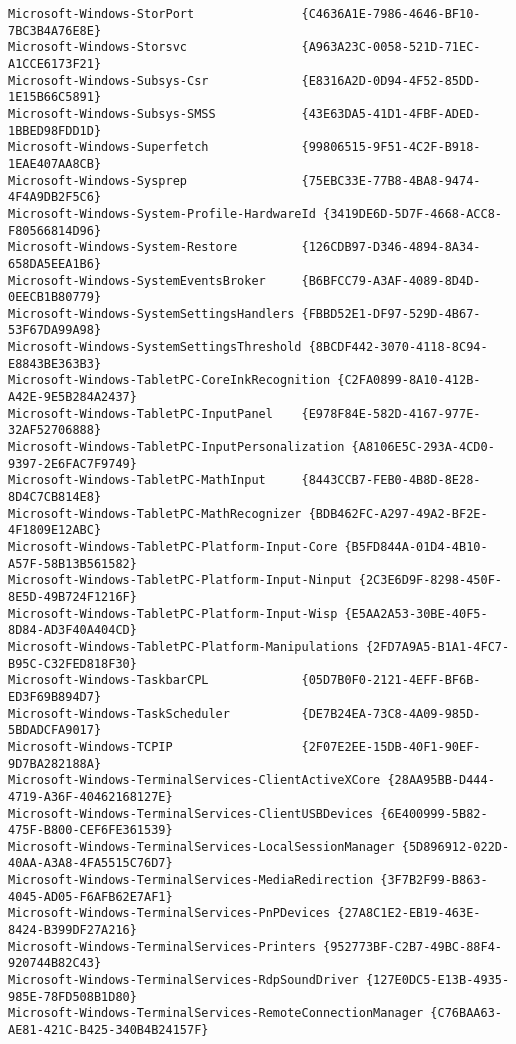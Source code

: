 \documentclass{report}
\begin{document}
\begin{lstlisting}[breaklines=true,basicstyle=\tiny]
Microsoft-Windows-StorPort               {C4636A1E-7986-4646-BF10-7BC3B4A76E8E}
Microsoft-Windows-Storsvc                {A963A23C-0058-521D-71EC-A1CCE6173F21}
Microsoft-Windows-Subsys-Csr             {E8316A2D-0D94-4F52-85DD-1E15B66C5891}
Microsoft-Windows-Subsys-SMSS            {43E63DA5-41D1-4FBF-ADED-1BBED98FDD1D}
Microsoft-Windows-Superfetch             {99806515-9F51-4C2F-B918-1EAE407AA8CB}
Microsoft-Windows-Sysprep                {75EBC33E-77B8-4BA8-9474-4F4A9DB2F5C6}
Microsoft-Windows-System-Profile-HardwareId {3419DE6D-5D7F-4668-ACC8-F80566814D96}
Microsoft-Windows-System-Restore         {126CDB97-D346-4894-8A34-658DA5EEA1B6}
Microsoft-Windows-SystemEventsBroker     {B6BFCC79-A3AF-4089-8D4D-0EECB1B80779}
Microsoft-Windows-SystemSettingsHandlers {FBBD52E1-DF97-529D-4B67-53F67DA99A98}
Microsoft-Windows-SystemSettingsThreshold {8BCDF442-3070-4118-8C94-E8843BE363B3}
Microsoft-Windows-TabletPC-CoreInkRecognition {C2FA0899-8A10-412B-A42E-9E5B284A2437}
Microsoft-Windows-TabletPC-InputPanel    {E978F84E-582D-4167-977E-32AF52706888}
Microsoft-Windows-TabletPC-InputPersonalization {A8106E5C-293A-4CD0-9397-2E6FAC7F9749}
Microsoft-Windows-TabletPC-MathInput     {8443CCB7-FEB0-4B8D-8E28-8D4C7CB814E8}
Microsoft-Windows-TabletPC-MathRecognizer {BDB462FC-A297-49A2-BF2E-4F1809E12ABC}
Microsoft-Windows-TabletPC-Platform-Input-Core {B5FD844A-01D4-4B10-A57F-58B13B561582}
Microsoft-Windows-TabletPC-Platform-Input-Ninput {2C3E6D9F-8298-450F-8E5D-49B724F1216F}
Microsoft-Windows-TabletPC-Platform-Input-Wisp {E5AA2A53-30BE-40F5-8D84-AD3F40A404CD}
Microsoft-Windows-TabletPC-Platform-Manipulations {2FD7A9A5-B1A1-4FC7-B95C-C32FED818F30}
Microsoft-Windows-TaskbarCPL             {05D7B0F0-2121-4EFF-BF6B-ED3F69B894D7}
Microsoft-Windows-TaskScheduler          {DE7B24EA-73C8-4A09-985D-5BDADCFA9017}
Microsoft-Windows-TCPIP                  {2F07E2EE-15DB-40F1-90EF-9D7BA282188A}
Microsoft-Windows-TerminalServices-ClientActiveXCore {28AA95BB-D444-4719-A36F-40462168127E}
Microsoft-Windows-TerminalServices-ClientUSBDevices {6E400999-5B82-475F-B800-CEF6FE361539}
Microsoft-Windows-TerminalServices-LocalSessionManager {5D896912-022D-40AA-A3A8-4FA5515C76D7}
Microsoft-Windows-TerminalServices-MediaRedirection {3F7B2F99-B863-4045-AD05-F6AFB62E7AF1}
Microsoft-Windows-TerminalServices-PnPDevices {27A8C1E2-EB19-463E-8424-B399DF27A216}
Microsoft-Windows-TerminalServices-Printers {952773BF-C2B7-49BC-88F4-920744B82C43}
Microsoft-Windows-TerminalServices-RdpSoundDriver {127E0DC5-E13B-4935-985E-78FD508B1D80}
Microsoft-Windows-TerminalServices-RemoteConnectionManager {C76BAA63-AE81-421C-B425-340B4B24157F}

\end{lstlisting}
\end{document}
